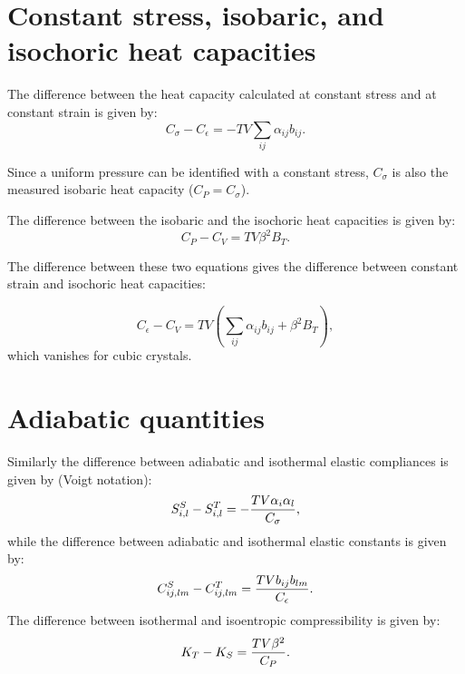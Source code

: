 \documentclass[12pt,a4paper]{article}
\begin{document}
\newpage
\section{\color{coral}Constant stress, isobaric, and isochoric 
heat capacities}

The difference between the heat capacity calculated at constant stress
and at constant strain is given by:
\begin{equation}
C_\sigma - C_\epsilon = - T V \sum_{ij} \alpha_{ij} b_{ij}.
\end{equation}

Since a uniform pressure can be identified with a constant stress, $C_\sigma$
is also the measured isobaric heat capacity ($C_P=C_\sigma$).

The difference between the isobaric and the isochoric heat capacities 
is given by:
\begin{equation}
C_P - C_V = T V \beta^2 B_T.
\end{equation}

The difference between these two equations gives the difference between
constant strain and isochoric heat capacities:

\begin{equation}
C_\epsilon - C_V =  T V \left( \sum_{ij} \alpha_{ij} b_{ij} + \beta^2 B_T
\right),
\end{equation}
which vanishes for cubic crystals.

\newpage
\section{\color{coral}Adiabatic quantities}

Similarly the difference between adiabatic and isothermal 
elastic compliances is given by (Voigt notation):
\begin{equation}
S^S_{i,l} - S^T_{i,l} = - {T V \alpha_{i} \alpha_{l} \over C_\sigma},
\end{equation}
while the difference between adiabatic and isothermal elastic constants
is given by:
\begin{equation}
C^S_{ij,lm} - C^T_{ij,lm} =  {T V b_{ij} b_{lm} \over C_\epsilon}.
\end{equation}
The difference between isothermal and isoentropic compressibility is given
by:
\begin{equation}
K_T - K_S =  {T V \beta^2 \over C_P}.
\end{equation}


\newpage
\end{document}
